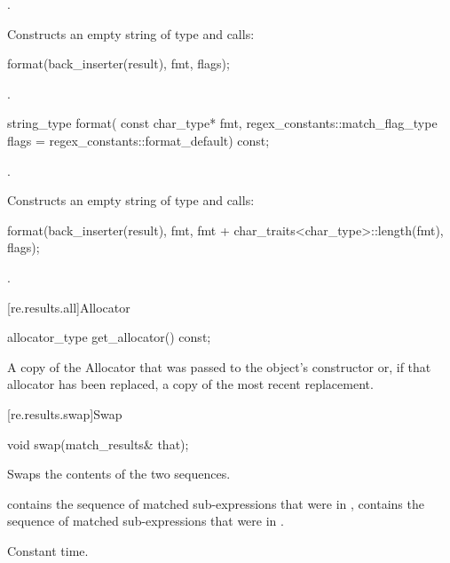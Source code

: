 \begin{itemdescr}
\pnum
\expects
{}.

\pnum
\effects
Constructs an empty string  of type  and
calls:
\begin{codeblock}
format(back_inserter(result), fmt, flags);
\end{codeblock}

\pnum
\returns
{}.
\end{itemdescr}

%
\begin{itemdecl}
string_type format(
    const char_type* fmt,
    regex_constants::match_flag_type flags = regex_constants::format_default) const;
\end{itemdecl}

\begin{itemdescr}
\pnum
\expects
{}.

\pnum
\effects
Constructs an empty string  of type  and
calls:
\begin{codeblock}
format(back_inserter(result), fmt, fmt + char_traits<char_type>::length(fmt), flags);
\end{codeblock}

\pnum
\returns
{}.
\end{itemdescr}

[re.results.all]{Allocator}%

%
\begin{itemdecl}
allocator_type get_allocator() const;
\end{itemdecl}

\begin{itemdescr}
\pnum
\returns
A copy of the Allocator that was passed to the object's constructor or, if that
allocator has been replaced, a copy of the most recent replacement.
\end{itemdescr}

[re.results.swap]{Swap}

%
\begin{itemdecl}
void swap(match_results& that);
\end{itemdecl}

\begin{itemdescr}
\pnum
\effects
Swaps the contents of the two sequences.

\pnum
\ensures
{} contains the sequence of matched
sub-expressions that were in ,  contains the
sequence of matched sub-expressions that were in .

\pnum
\complexity
Constant time.
\end{itemdescr}

